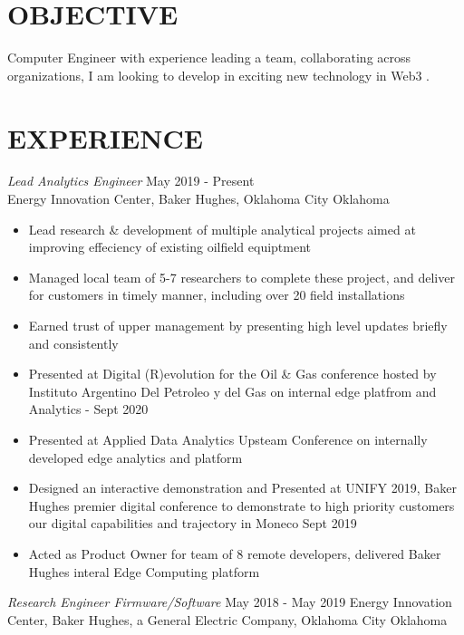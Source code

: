\documentclass[line,margin]{res}
\begin{document}
\address{sammgtanner@gmail.com}
\address{(208) 830-1983}


\begin{resume}

	\section{OBJECTIVE}
	Computer Engineer with experience leading a team, collaborating across organizations, I am looking to develop in exciting new technology in Web3 .

	\section{EXPERIENCE}
	 {\sl Lead Analytics Engineer} \hfill May 2019 - Present \\
	Energy Innovation Center, Baker Hughes, Oklahoma City Oklahoma
	\begin{itemize} \itemsep -2pt
		\item Lead research \& development of multiple analytical projects aimed at improving effeciency of existing oilfield equiptment
		\item Managed local team of 5-7 researchers to complete these project, and deliver for customers in timely manner, including over 20 field installations
		\item Earned trust of upper management by presenting high level updates briefly and consistently
		\item Presented at Digital (R)evolution for the Oil \& Gas conference hosted by Instituto Argentino Del Petroleo y del Gas on internal edge platfrom and Analytics - Sept 2020
		\item Presented at Applied Data Analytics Upsteam Conference on internally developed edge analytics and platform
		\item Designed an interactive demonstration and Presented at UNIFY 2019, Baker Hughes premier digital conference to demonstrate to high priority customers our digital capabilities and trajectory in Moneco Sept 2019
		\item Acted as Product Owner for team of 8 remote developers, delivered Baker Hughes interal Edge Computing platform
	\end{itemize}
	{\sl Research Engineer Firmware/Software} \hfill May 2018 - May 2019
	Energy Innovation Center, Baker Hughes, a General Electric Company, Oklahoma City Oklahoma
	\begin{itemize} \itemsep -2pt

\end{itemize}
\end{resume}
\end{document}
